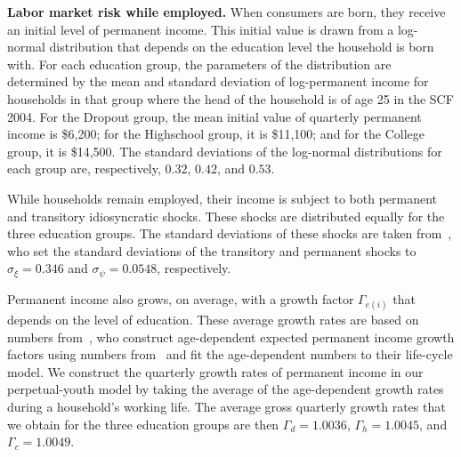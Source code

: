 \documentclass[\latexroot/\projectname]{subfiles}
\begin{document}

\textbf{Labor market risk while employed.} When consumers are born, they receive an initial level of permanent income.
This initial value is drawn from a log-normal distribution that depends on the education level the household is born with.
For each education group, the parameters of the distribution are determined by the mean and standard deviation of log-permanent income for households in that group where the head of the household is of age 25 in the SCF 2004.
For the Dropout group, the mean initial value of quarterly permanent income is \$6,200; for the Highschool group, it is \$11,100; and for the College group, it is \$14,500.
The standard deviations of the log-normal distributions for each group are, respectively, $0.32$, $0.42$, and $0.53$.

While households remain employed, their income is subject to both permanent and transitory idiosyncratic shocks.
These shocks are distributed equally for the three education groups.
The standard deviations of these shocks are taken from~\cite{carroll2020sticky}, who set the standard deviations of the transitory and permanent shocks to $\sigma_\xi=0.346$ and $\sigma_\psi=0.0548$, respectively.

Permanent income also grows, on average, with a growth factor $\Gamma_{e(i)}$ that depends on the level of education.
These average growth rates are based on numbers from~\cite{carroll2020modeling}, who construct age-dependent expected permanent income growth factors using numbers from~\cite{cagetti2003wealth} and fit the age-dependent numbers to their life-cycle model.
We construct the quarterly growth rates of permanent income in our perpetual-youth model by taking the average of the age-dependent growth rates during a household's working life.
The average gross quarterly growth rates that we obtain for the three education groups are then $\Gamma_d=1.0036$, $\Gamma_h=1.0045$, and $\Gamma_c=1.0049$.
\end{document}
